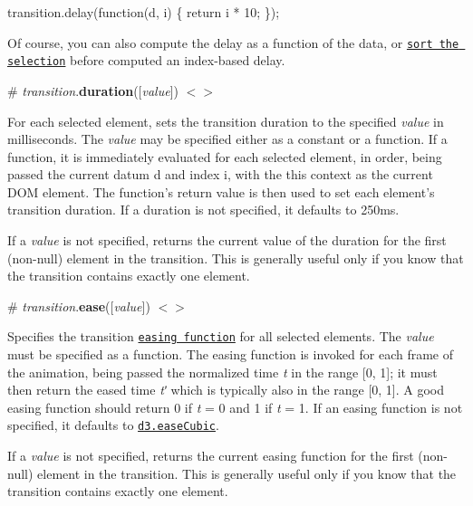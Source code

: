 \begin{DoxyCode}
transition.delay(function(d, i) \{ return i * 10; \});
\end{DoxyCode}


Of course, you can also compute the delay as a function of the data, or \href{https://github.com/d3/d3-selection#selection_sort}{\tt sort the selection} before computed an index-\/based delay.

\label{_transition_duration}%
\# {\itshape transition}.{\bfseries duration}(\mbox{[}{\itshape value}\mbox{]}) \href{https://github.com/d3/d3-transition/blob/master/src/transition/duration.js}{\tt $<$$>$}

For each selected element, sets the transition duration to the specified {\itshape value} in milliseconds. The {\itshape value} may be specified either as a constant or a function. If a function, it is immediately evaluated for each selected element, in order, being passed the current datum {\ttfamily d} and index {\ttfamily i}, with the {\ttfamily this} context as the current D\+OM element. The function’s return value is then used to set each element’s transition duration. If a duration is not specified, it defaults to 250ms.

If a {\itshape value} is not specified, returns the current value of the duration for the first (non-\/null) element in the transition. This is generally useful only if you know that the transition contains exactly one element.

\label{_transition_ease}%
\# {\itshape transition}.{\bfseries ease}(\mbox{[}{\itshape value}\mbox{]}) \href{https://github.com/d3/d3-transition/blob/master/src/transition/ease.js}{\tt $<$$>$}

Specifies the transition \href{https://github.com/d3/d3-ease}{\tt easing function} for all selected elements. The {\itshape value} must be specified as a function. The easing function is invoked for each frame of the animation, being passed the normalized time {\itshape t} in the range \mbox{[}0, 1\mbox{]}; it must then return the eased time {\itshape tʹ} which is typically also in the range \mbox{[}0, 1\mbox{]}. A good easing function should return 0 if {\itshape t} = 0 and 1 if {\itshape t} = 1. If an easing function is not specified, it defaults to \href{https://github.com/d3/d3-ease#easeCubic}{\tt d3.\+ease\+Cubic}.

If a {\itshape value} is not specified, returns the current easing function for the first (non-\/null) element in the transition. This is generally useful only if you know that the transition contains exactly one element.

